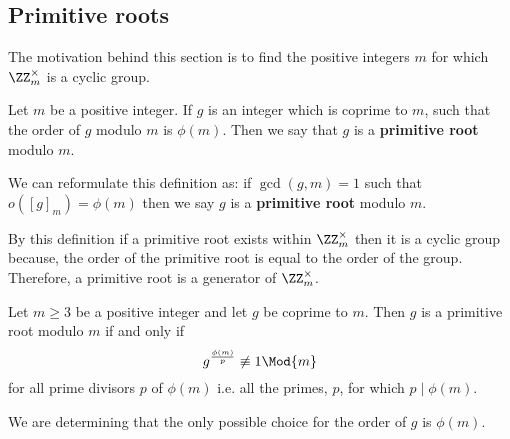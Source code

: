 \documentclass[12pt, a4paper]{article}
\begin{document}
\subsection{Primitive roots}

The motivation behind this section is to find the positive integers \(m\) for which \(\ZZ_m^{\times}\) is a cyclic group.

\begin{definition}
    Let \(m\) be a positive integer. If \(g\) is an integer which is coprime to \(m\), such that the order of \(g\) modulo \(m\) is \(\phi(m)\). Then we say that \(g\) is a \textbf{primitive root} modulo \(m\).
\end{definition}

\begin{mdnote}
    We can reformulate this definition as: if \(\gcd(g,m)=1\) such that \(o([g]_m)=\phi(m)\) then we say \(g\) is a \textbf{primitive root} modulo \(m\).
\end{mdnote}

\begin{mdremark}
    By this definition if a primitive root exists within \(\ZZ_m^{\times}\) then it is a cyclic group because, the order of the primitive root is equal to the order of the group. Therefore, a primitive root is a generator of \(\ZZ_m^{\times}\).
\end{mdremark}

\begin{mdlemma}
    Let \(m\geq 3\) be a positive integer and let \(g\) be coprime to \(m\). Then \(g\) is a primitive root modulo \(m\) if and only if 
    \[g^{\frac{\phi(m)}{p}} \not\equiv 1 \Mod{m}\]
    for all prime divisors \(p\) of \(\phi(m)\) i.e. all the primes, \(p\), for which \(p\mid \phi(m)\).
\end{mdlemma}

\begin{mdnote}
    We are determining that the only possible choice for the order of \(g\) is \(\phi(m)\).
\end{mdnote}
\end{document}
